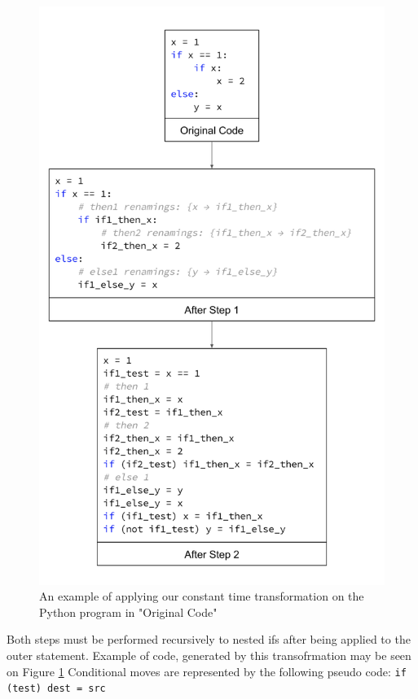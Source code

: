 \documentclass[sigplan, review]{acmart}
\begin{document}
\begin{figure}[bhp]
\includegraphics[width=\columnwidth]{cmov_if_transofrmation.png}
\caption{ An example of applying our constant time transformation on the Python program in "Original Code"}
\label{fig:cmov_if_transofrmation}
\end{figure}

Both steps must be performed recursively to nested ifs after being applied to the outer statement. Example of code, generated by this transofrmation may be seen on Figure \ref{fig:cmov_if_transofrmation} Conditional moves are represented by the following pseudo code: \texttt{if (test) dest = src}
\end{document}
